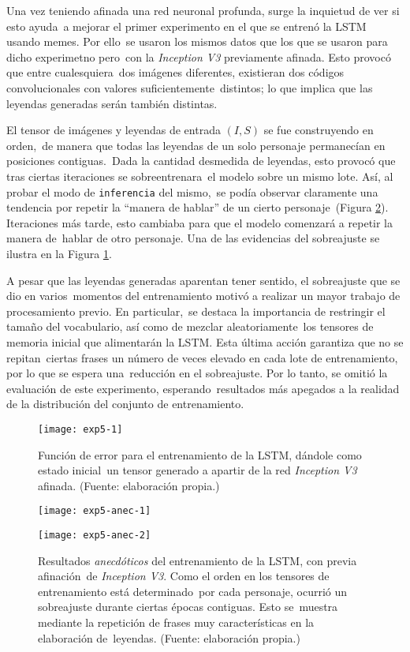 Una vez teniendo afinada una red neuronal profunda, surge la inquietud de ver si esto ayuda\
a mejorar el primer experimento en el que se entrenó la LSTM usando memes. Por ello\
se usaron los mismos datos que los que se usaron para dicho experimetno pero\
con la \emph{Inception V3} previamente afinada. Esto provocó que entre cualesquiera\
dos imágenes diferentes, existieran dos códigos convolucionales con valores suficientemente\
distintos; lo que implica que las leyendas generadas serán también distintas.\par
El tensor de imágenes y leyendas de entrada $(I, S)$ se fue construyendo en orden,\
de manera que todas las leyendas de un solo personaje permanecían en posiciones contiguas.\
Dada la cantidad desmedida de leyendas, esto provocó que tras ciertas iteraciones se sobreentrenara\
el modelo sobre un mismo lote. Así, al probar el modo de \verb+inferencia+ del mismo,\
se podía observar claramente una tendencia por repetir la ``manera de hablar'' de un cierto personaje\
(Figura \ref{exp5:anec}). Iteraciones más tarde, esto cambiaba para que el modelo comenzará a repetir la manera de\
hablar de otro personaje. Una de las evidencias del sobreajuste se ilustra en la Figura \ref{exp5}.\par
A pesar que las leyendas generadas aparentan tener sentido, el sobreajuste que se dio en varios\
momentos del entrenamiento motivó a realizar un mayor trabajo de procesamiento previo. En particular,\
se destaca la importancia de restringir el tamaño del vocabulario, así como de mezclar aleatoriamente\
los tensores de memoria inicial que alimentarán la LSTM. Esta última acción garantiza que no se repitan\
ciertas frases un número de veces elevado en cada lote de entrenamiento, por lo que se espera una\
reducción en el sobreajuste. Por lo tanto, se omitió la evaluación de este experimento, esperando\
resultados más apegados a la realidad de la distribución del conjunto de entrenamiento.

\begin{figure}[h]
  \texttt{[image: exp5-1]}
  \caption{
    Función de error para el entrenamiento de la LSTM, dándole como estado inicial\
    un tensor generado a apartir de la red \emph{Inception V3} afinada.
    (Fuente: elaboración propia.)
  }
  \label{exp5}
\end{figure}

\begin{figure}[H]
  \begin{minipage}[c]{\linewidth}
    \texttt{[image: exp5-anec-1]}
  \end{minipage}\hfill
  \begin{minipage}[c]{\linewidth}
    \texttt{[image: exp5-anec-2]}
  \end{minipage}
  \caption{
    Resultados \emph{anecdóticos} del entrenamiento de la LSTM, con previa afinación\
    de \emph{Inception V3}. Como el orden en los tensores de entrenamiento está determinado\
    por cada personaje, ocurrió un sobreajuste durante ciertas épocas contiguas. Esto se\
    muestra mediante la repetición de frases muy características en la elaboración de\
    leyendas.
    (Fuente: elaboración propia.)
  }
  \label{exp5:anec}
\end{figure}

